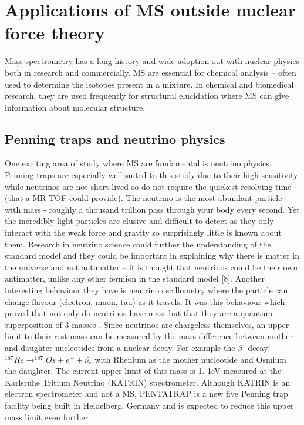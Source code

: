 \section{Applications of MS outside nuclear force theory}

Mass spectrometry has a long history and wide adoption out with nuclear physics both in research and commercially.
MS are essential for chemical analysis – often used to determine the isotopes present in a mixture.
In chemical and biomedical research, they are used frequently for structural elucidation where MS can give information about molecular structure. \cite{bhattarai_chapter_2020}

\subsection{Penning traps and neutrino physics}
One exciting area of study where MS are fundamental is neutrino physics.
Penning traps are especially well suited to this study due to their high sensitivity while neutrinos are not short lived so do not require the quickest resolving time (that a MR-TOF could provide).
The neutrino is the most abundant particle with mass - roughly a thousand trillion pass through your body every second. \cite{noauthor_whats_nodate}
Yet the incredibly light particles are elusive and difficult to detect as they only interact with the weak force and gravity so surprisingly little is known about them. \cite{noauthor_what_nodate}
Research in neutrino science could further the understanding of the standard model and they could be important in explaining why there is matter in the universe and not antimatter \cite{gibney_morphing_2015} – it is thought that neutrinos could be their own antimatter, unlike any other fermion in the standard model [8].
Another interesting behaviour they have is neutrino oscillometry where the particle can change flavour (electron, muon, tau) as it travels.
It was this behaviour which proved that not only do neutrinos have mass but that they are a quantum superposition of 3 masses \cite{gibney_morphing_2015}.
Since neutrinos are chargeless themselves, an upper limit to their rest mass can be measured by the mass difference between mother and daughter nucleotides from a nuclear decay. \cite{eliseev_penning-trap_2013}
For example the $\beta$ -decay: $^{187}Re \longrightarrow ^{187}Os + e^- + \bar{\nu _e}$ with Rhenium as the mother nucleotide and Osmium the daughter. \cite{repp_pentatrap_2012}
The current upper limit of this mass is 1.
1eV measured at the Karlsruhe Tritium Neutrino (KATRIN) spectrometer. \cite{castelvecchi_physicists_2019}
Although KATRIN is an electron spectrometer and not a MS, PENTATRAP is a new five Penning trap facility being built in Heidelberg, Germany and is expected to reduce this upper mass limit even further \cite{repp_pentatrap_2012}.

